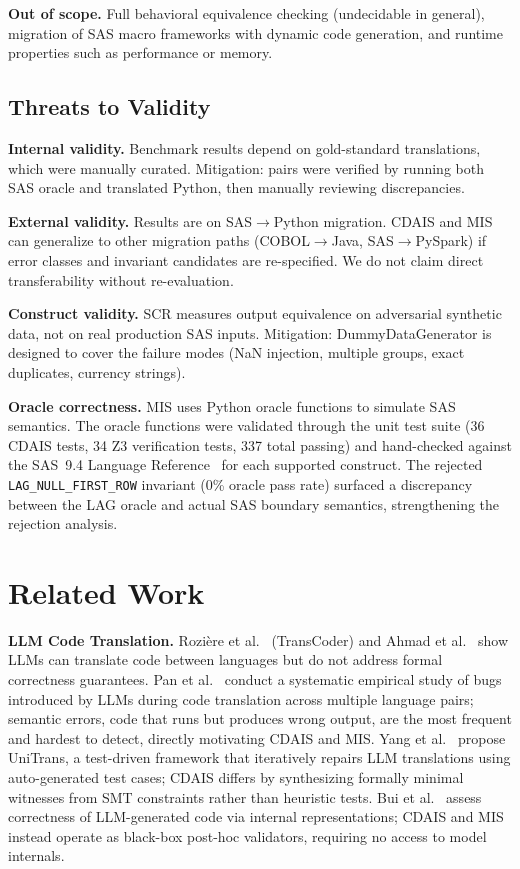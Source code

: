 \documentclass[conference]{IEEEtran}
\begin{document}
\textbf{Out of scope.} Full behavioral equivalence checking (undecidable in general),
migration of SAS macro frameworks with dynamic code generation, and runtime properties
such as performance or memory.

\subsection{Threats to Validity}

\textbf{Internal validity.} Benchmark results depend on gold-standard translations,
which were manually curated. Mitigation: pairs were verified by running both SAS
oracle and translated Python, then manually reviewing discrepancies.

\textbf{External validity.} Results are on SAS$\rightarrow$Python migration. CDAIS
and MIS can generalize to other migration paths (COBOL$\rightarrow$Java,
SAS$\rightarrow$PySpark) if error classes and invariant candidates are re-specified.
We do not claim direct transferability without re-evaluation.

\textbf{Construct validity.} SCR measures output equivalence on adversarial synthetic
data, not on real production SAS inputs. Mitigation: DummyDataGenerator is designed
to cover the failure modes (NaN injection, multiple groups, exact duplicates, currency
strings).

\textbf{Oracle correctness.} MIS uses Python oracle functions to simulate SAS
semantics. The oracle functions were validated through the unit test suite (36 CDAIS
tests, 34 Z3 verification tests, 337 total passing) and hand-checked against the
SAS~9.4 Language Reference~\cite{sas94} for each supported construct. The rejected
\texttt{LAG\_NULL\_FIRST\_ROW} invariant (0\% oracle pass rate) surfaced a
discrepancy between the LAG oracle and actual SAS boundary semantics, strengthening
the rejection analysis.


\section{Related Work}

\textbf{LLM Code Translation.} Rozière et al.~\cite{transcoder} (TransCoder) and
Ahmad et al.~\cite{avatar} show LLMs can translate code between languages but do not
address formal correctness guarantees. Pan et al.~\cite{pan2024} conduct a systematic
empirical study of bugs introduced by LLMs during code translation across multiple
language pairs; semantic errors, code that runs but produces wrong output, are the
most frequent and hardest to detect, directly motivating CDAIS and MIS. Yang et
al.~\cite{unitrans} propose UniTrans, a test-driven framework that iteratively repairs
LLM translations using auto-generated test cases; CDAIS differs by synthesizing
formally minimal witnesses from SMT constraints rather than heuristic tests.
Bui et al.~\cite{bui2025} assess correctness of LLM-generated code via internal
representations; CDAIS and MIS instead operate as black-box post-hoc validators,
requiring no access to model internals.
\end{document}
